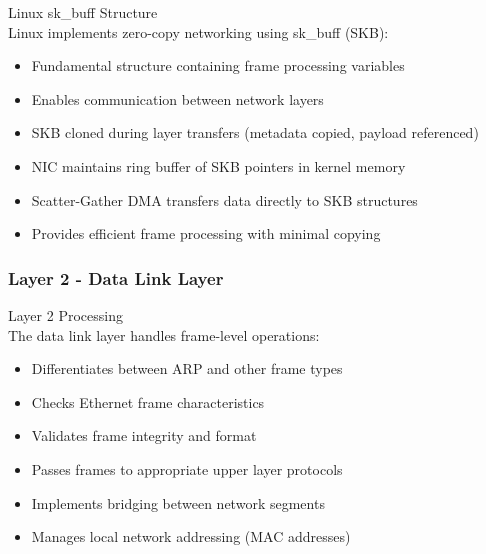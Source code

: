 \begin{definition}{Linux sk\_buff Structure}\\
    Linux implements zero-copy networking using sk\_buff (SKB):
    \begin{itemize}
        \item Fundamental structure containing frame processing variables
        \item Enables communication between network layers
        \item SKB cloned during layer transfers (metadata copied, payload referenced)
        \item NIC maintains ring buffer of SKB pointers in kernel memory
        \item Scatter-Gather DMA transfers data directly to SKB structures
        \item Provides efficient frame processing with minimal copying
    \end{itemize}
\end{definition}

\multend

\subsubsection{Layer 2 - Data Link Layer}


\begin{definition}{Layer 2 Processing}\\
    The data link layer handles frame-level operations:
    \begin{itemize}
        \item Differentiates between ARP and other frame types
        \item Checks Ethernet frame characteristics
        \item Validates frame integrity and format
        \item Passes frames to appropriate upper layer protocols
        \item Implements bridging between network segments
        \item Manages local network addressing (MAC addresses)
    \end{itemize}
\end{definition}

